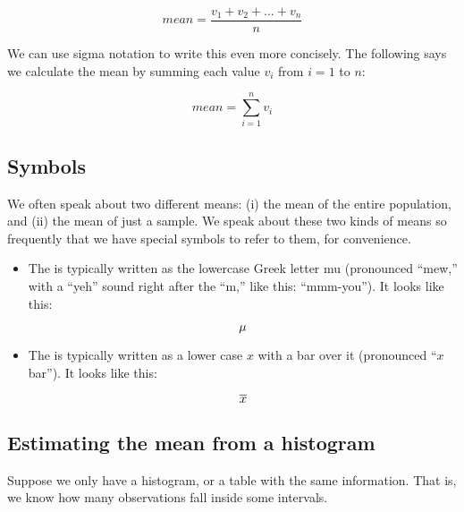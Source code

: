 \documentclass[../../../main.tex]{subfiles}
\begin{document}
\begin{equation*}
  mean = \frac{v_{1} + v_{2} + \ldots + v_{n}}{n}
\end{equation*}

\noindent
We can use sigma notation to write this even more concisely. The following says we calculate the mean by summing each value $v_{i}$ from $i = 1$ to $n$:

\begin{equation*}
  mean = \sum_{i=1}^{n} v_{i}
\end{equation*}


\subsection{Symbols}

We often speak about two different means: (i) the mean of the entire population, and (ii) the mean of just a sample. We speak about these two kinds of means so frequently that we have special symbols to refer to them, for convenience.

\begin{itemize}

  \item The  is typically written as the lowercase Greek letter mu (pronounced ``mew,'' with a ``yeh'' sound right after the ``m,'' like this: ``mmm-you''). It looks like this:
  
  \begin{equation*}
    \mu{}
  \end{equation*}
  
  \item The  is typically written as a lower case $x$ with a bar over it (pronounced ``$x$ bar''). It looks like this:
  
  \begin{equation*}
    \overline{x}
  \end{equation*}

\end{itemize}


\subsection{Estimating the mean from a histogram}

Suppose we only have a histogram, or a table with the same information. That is, we know how many observations fall inside some intervals.
\end{document}
